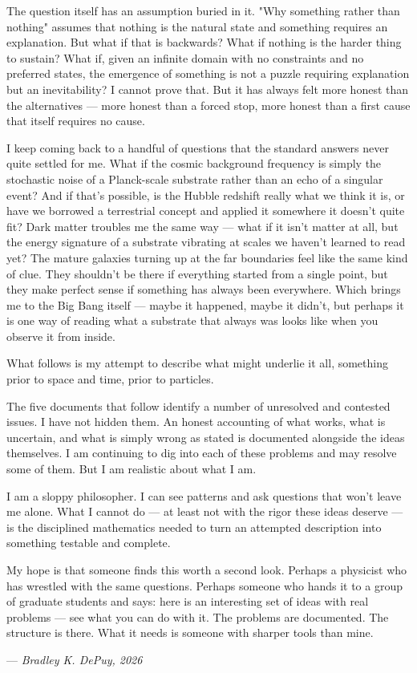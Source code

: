 \documentclass[11pt,letterpaper]{article}
\begin{document}
The question itself has an assumption buried in it. "Why something rather than nothing" assumes that nothing is the natural state and something requires an explanation. But what if that is backwards? What if nothing is the harder thing to sustain? What if, given an infinite domain with no constraints and no preferred states, the emergence of something is not a puzzle requiring explanation but an inevitability? I cannot prove that. But it has always felt more honest than the alternatives --- more honest than a forced stop, more honest than a first cause that itself requires no cause.

I keep coming back to a handful of questions that the standard answers never quite settled for me. What if the cosmic background frequency is simply the stochastic noise of a Planck-scale substrate
rather than an echo of a singular event? And if that's possible, is the Hubble redshift really what we think it is, or have we borrowed a terrestrial concept and applied it somewhere it doesn't quite fit? Dark matter troubles me the same way — what if it isn't matter at all, but the energy signature of a substrate vibrating at scales we haven't learned to read yet? The mature galaxies turning up at the far boundaries feel like the same kind of clue. They shouldn't be there if everything started from a single point, but they make perfect sense if something has always been everywhere. Which brings me  to the Big Bang itself — maybe it happened, maybe it didn't, but perhaps it is one way of reading what a substrate that always was looks like when you observe it from inside.

What follows is my attempt to describe what might underlie it all, something prior to space and time, prior to particles.

The five documents that follow identify a number of unresolved and contested issues. I have not hidden them. An honest accounting of what works, what is uncertain, and what is simply wrong as stated is documented alongside the ideas themselves. I am continuing to dig into each of these problems and may resolve some of them. But I am realistic about what I am.

I am a sloppy philosopher. I can see patterns and ask questions that won't leave me alone. What I cannot do — at least not with the rigor these ideas deserve — is the disciplined mathematics needed to turn an attempted description into something testable and complete.

My hope is that someone finds this worth a second look. Perhaps a physicist who has wrestled with the same questions. Perhaps someone who hands it to a group of graduate students and says: here is an interesting set of ideas with real problems — see what you can do with it. The problems are documented. The structure is there. What it needs is someone with sharper tools than mine.

--- \emph{Bradley K. DePuy, 2026}
\end{document}
